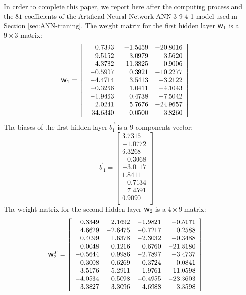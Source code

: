 \documentclass[algorithms,article,submit,pdftex,moreauthors]{Definitions/mdpi}
\DeclareRobustCommand{\w}{\mbox{\large\ensuremath{\mathsf{w}}}}
\begin{document}
In order to complete this paper, we report here after the computing process and the $81$ coefficients of the Artificial Neural Network ANN-3-9-4-1 model used in Section \ref{sec:ANN-traning}.
The weight matrix for the first hidden layer $\w_1$ is a $9\times3$ matrix:
\begin{equation*}
\w_1 = \left[
\begin{array}{rrr}
0.7393 & -1.5459 & -20.8016\\
-9.5152 & 3.0979 & -3.5620\\
-4.3782 & -11.3825 & 0.9006\\
-0.5907 & 0.3921 & -10.2277\\
-4.4714 & 3.5413 & -3.2122\\
-0.3266 & 1.0411 & -4.1043\\
-1.9463 & 0.4738 & -7.5042\\
2.0241 & 5.7676 & -24.9657\\
-34.6340 & 0.0500 & -3.8260\\
\end{array}\right]
\end{equation*}
The biases of the first hidden layer $\overrightarrow{b_1}$ is a $9$ components vector:
\begin{equation*}
\overrightarrow{b}_1 = \left[
\begin{array}{r}
3.7316\\
-1.0772\\
6.3268\\
-0.3068\\
-3.0117\\
1.8411\\
-0.7134\\
-7.4591\\
0.9090\\
\end{array}\right]
\end{equation*}
The weight matrix for the second hidden layer $\w_2$ is a $4\times9$ matrix:
\begin{equation*}
\w_2^T = \left[
\begin{array}{rrrr}
0.3349 & 2.1692 & -1.9821 & -0.5171\\
4.6629 & -2.6475 & -0.7217 & 0.2588\\
0.4099 & 1.6378 & -2.3032 & -0.3488\\
0.0048 & 0.1216 & 0.6760 & -21.8180\\
-0.5644 & 0.9986 & -2.7897 & -3.4737\\
-0.3008 & -0.6269 & -0.3724 & -0.0841\\
-3.5176 & -5.2911 & 1.9761 & 11.0598\\
-4.0534 & 0.5098 & -0.4955 & -23.3603\\
3.3827 & -3.3096 & 4.6988 & -3.3598\\
\end{array}\right]
\end{equation*}
\end{document}
